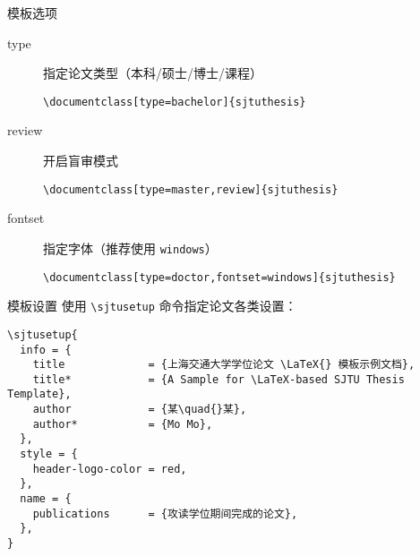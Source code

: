 \begin{frame}[fragile]{模板选项}
  \begin{description}
    \item[type] 指定论文类型（本科/硕士/博士/课程）
      \begin{lstlisting}[basicstyle=\ttfamily]
\documentclass[type=bachelor]{sjtuthesis}
  \end{lstlisting}
    \item[review] 开启盲审模式
      \begin{lstlisting}[basicstyle=\ttfamily]
\documentclass[type=master,review]{sjtuthesis}
  \end{lstlisting}
    \item[fontset] 指定字体（推荐使用 \verb|windows|）
      \begin{lstlisting}[basicstyle=\ttfamily]
\documentclass[type=doctor,fontset=windows]{sjtuthesis}
  \end{lstlisting}
  \end{description}
\end{frame}

\begin{frame}[fragile]{模板设置}
  使用 \verb|\sjtusetup| 命令指定论文各类设置：
  \begin{lstlisting}
\sjtusetup{
  info = {
    title             = {上海交通大学学位论文 \LaTeX{} 模板示例文档},
    title*            = {A Sample for \LaTeX-based SJTU Thesis Template},
    author            = {某\quad{}某},
    author*           = {Mo Mo},
  },
  style = {
    header-logo-color = red,
  },
  name = {
    publications      = {攻读学位期间完成的论文},
  },
}
  \end{lstlisting}
\end{frame}

